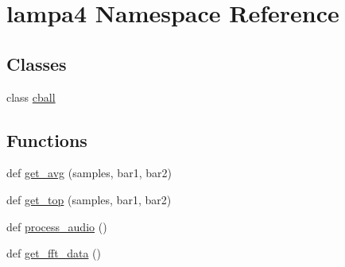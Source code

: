 \hypertarget{namespacelampa4}{}\section{lampa4 Namespace Reference}
\label{namespacelampa4}
\subsection*{Classes}
\begin{DoxyCompactItemize}
\item 
class \hyperlink{classlampa4_1_1cball}{cball}
\end{DoxyCompactItemize}
\subsection*{Functions}
\begin{DoxyCompactItemize}
\item 
def \hyperlink{namespacelampa4_a302ab3acaa65ffa45cd4113f8bdf5a6f}{get\+\_\+avg} (samples, bar1, bar2)
\item 
def \hyperlink{namespacelampa4_afd96591ceedfb79781d917a91760592e}{get\+\_\+top} (samples, bar1, bar2)
\item 
def \hyperlink{namespacelampa4_adea0ce009717aaea638affbb7b7860cb}{process\+\_\+audio} ()
\item 
def \hyperlink{namespacelampa4_ac033591ccd7b5c401328e4ff91a88288}{get\+\_\+fft\+\_\+data} ()
\end{DoxyCompactItemize}
